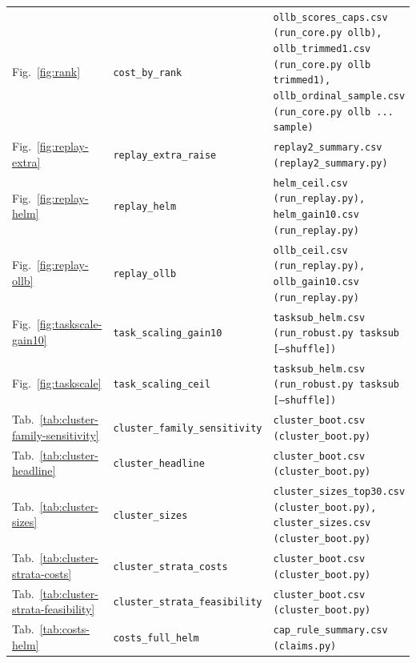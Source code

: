 \begin{longtable}{@{}p{0.55in} p{1.55in} p{3.0in}@{}}
Fig.~\ref{fig:rank} & \texttt{cost\_\allowbreak by\_\allowbreak rank} & \texttt{ollb\_\allowbreak scores\_\allowbreak caps.csv (run\_\allowbreak core.py ollb), ollb\_\allowbreak trimmed1.csv (run\_\allowbreak core.py ollb trimmed1), ollb\_\allowbreak ordinal\_\allowbreak sample.csv (run\_\allowbreak core.py ollb ... sample)} \\
Fig.~\ref{fig:replay-extra} & \texttt{replay\_\allowbreak extra\_\allowbreak raise} & \texttt{replay2\_\allowbreak summary.csv (replay2\_\allowbreak summary.py)} \\
Fig.~\ref{fig:replay-helm} & \texttt{replay\_\allowbreak helm} & \texttt{helm\_\allowbreak ceil.csv (run\_\allowbreak replay.py), helm\_\allowbreak gain10.csv (run\_\allowbreak replay.py)} \\
Fig.~\ref{fig:replay-ollb} & \texttt{replay\_\allowbreak ollb} & \texttt{ollb\_\allowbreak ceil.csv (run\_\allowbreak replay.py), ollb\_\allowbreak gain10.csv (run\_\allowbreak replay.py)} \\
Fig.~\ref{fig:taskscale-gain10} & \texttt{task\_\allowbreak scaling\_\allowbreak gain10} & \texttt{tasksub\_\allowbreak helm.csv (run\_\allowbreak robust.py tasksub [--shuffle])} \\
Fig.~\ref{fig:taskscale} & \texttt{task\_\allowbreak scaling\_\allowbreak ceil} & \texttt{tasksub\_\allowbreak helm.csv (run\_\allowbreak robust.py tasksub [--shuffle])} \\
Tab.~\ref{tab:cluster-family-sensitivity} & \texttt{cluster\_\allowbreak family\_\allowbreak sensitivity} & \texttt{cluster\_\allowbreak boot.csv (cluster\_\allowbreak boot.py)} \\
Tab.~\ref{tab:cluster-headline} & \texttt{cluster\_\allowbreak headline} & \texttt{cluster\_\allowbreak boot.csv (cluster\_\allowbreak boot.py)} \\
Tab.~\ref{tab:cluster-sizes} & \texttt{cluster\_\allowbreak sizes} & \texttt{cluster\_\allowbreak sizes\_\allowbreak top30.csv (cluster\_\allowbreak boot.py), cluster\_\allowbreak sizes.csv (cluster\_\allowbreak boot.py)} \\
Tab.~\ref{tab:cluster-strata-costs} & \texttt{cluster\_\allowbreak strata\_\allowbreak costs} & \texttt{cluster\_\allowbreak boot.csv (cluster\_\allowbreak boot.py)} \\
Tab.~\ref{tab:cluster-strata-feasibility} & \texttt{cluster\_\allowbreak strata\_\allowbreak feasibility} & \texttt{cluster\_\allowbreak boot.csv (cluster\_\allowbreak boot.py)} \\
Tab.~\ref{tab:costs-helm} & \texttt{costs\_\allowbreak full\_\allowbreak helm} & \texttt{cap\_\allowbreak rule\_\allowbreak summary.csv (claims.py)} \\

\end{longtable}
